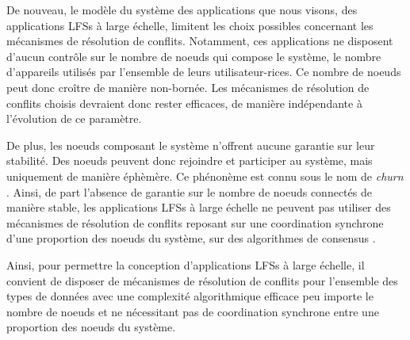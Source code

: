 De nouveau, le modèle du système des applications que nous visons, \ie des applications \acp{LFS} à large échelle, limitent les choix possibles concernant les mécanismes de résolution de conflits.
Notamment, ces applications ne disposent d'aucun contrôle sur le nombre de noeuds qui compose le système, \ie le nombre d'appareils utilisés par l'ensemble de leurs utilisateur-rices.
Ce nombre de noeuds peut donc croître de manière non-bornée.
Les mécanismes de résolution de conflits choisis devraient donc rester efficaces, de manière indépendante à l'évolution de ce paramètre.

De plus, les noeuds composant le système n'offrent aucune garantie sur leur stabilité.
Des noeuds peuvent donc rejoindre et participer au système, mais uniquement de manière éphèmère.
Ce phénonème est connu sous le nom de \emph{churn} \cite{understandingChurnP2PNetworks2006}.
Ainsi, de part l'absence de garantie sur le nombre de noeuds connectés de manière stable, les applications \acp{LFS} à large échelle ne peuvent pas utiliser des mécanismes de résolution de conflits reposant sur une coordination synchrone d'une proportion des noeuds du système, \ie sur des algorithmes de consensus \cite{1998-paxos-lamport, 2014-raft-ongaro}.

Ainsi, pour permettre la conception d'applications \acp{LFS} à large échelle, il convient de disposer de mécanismes de résolution de conflits pour l'ensemble des types de données avec une complexité algorithmique efficace peu importe le nombre de noeuds et ne nécessitant pas de coordination synchrone entre une proportion des noeuds du système.
